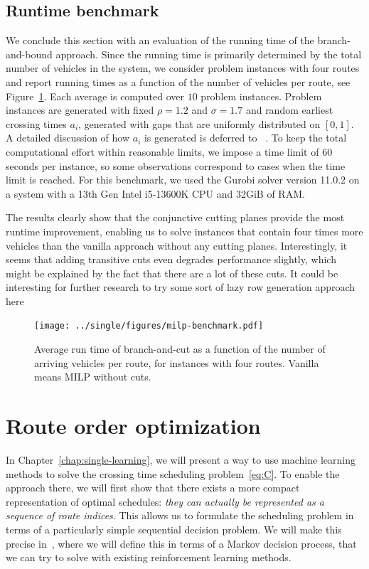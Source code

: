 \documentclass[a4paper]{report}
\theoremstyle{definition}
\theoremstyle{plain}
\begin{document}
\subsection{Runtime benchmark}\label{sec:runtime-bench}

We conclude this section with an evaluation of the running time of the
branch-and-bound approach.
%
Since the running time is primarily determined by the total number of vehicles
in the system, we consider problem instances with four routes and report running
times as a function of the number of vehicles per route, see
Figure~\ref{fig:running_time}.
%
Each average is computed over $10$ problem instances.
%
Problem instances are generated with fixed $\rho=1.2$ and $\sigma=1.7$ and
random earliest crossing times $a_i$, generated with gaps that are uniformly
distributed on $[0,1]$.
%
A detailed discussion of how $a_i$ is generated is deferred to
~.
%
To keep the total computational effort within reasonable limits, we impose a
time limit of 60 seconds per instance, so some observations correspond to cases
when the time limit is reached.
%
For this benchmark, we used the Gurobi solver version 11.0.2 on a system with a
13th Gen Intel i5-13600K CPU and 32GiB of RAM.

The results clearly show that the conjunctive cutting planes provide the most
runtime improvement, enabling us to solve instances that contain four times more
vehicles than the vanilla approach without any cutting planes.
%
Interestingly, it seems that adding transitive cuts even degrades performance
slightly, which might be explained by the fact that there are a lot of these
cuts. It could be interesting for further research to try some sort of lazy row
generation approach here

\begin{figure}
  \centering
  \texttt{[image: ../single/figures/milp-benchmark.pdf]}
  \caption{Average run time of branch-and-cut as a function of the number of
    arriving vehicles per route, for instances with four routes. Vanilla means
    MILP without cuts.}%
  \label{fig:running_time}
\end{figure}

\section{Route order optimization}\label{sec:sequence-representation}

In Chapter~\ref{chap:single-learning}, we will present a way to use machine learning methods to
solve the crossing time scheduling problem~\eqref{eq:C}.
%
To enable the approach there, we will first show that there exists a more
compact representation of optimal schedules: \emph{they can actually be
  represented as a sequence of route indices}.
%
This allows us to formulate the scheduling problem in terms of a particularly
simple sequential decision problem. We will make this precise in~,
where we will define this in terms of a Markov decision process, that we can try
to solve with existing reinforcement learning methods.
\end{document}
